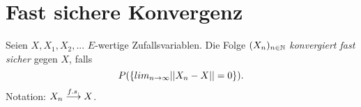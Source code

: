 \section{Fast sichere Konvergenz}
\begin{mydef}
    Seien $X, X_1, X_2,...$ $E$-wertige Zufallsvariablen. Die Folge $(X_n)_{n \in \mathbb{N}}$ \textit{konvergiert fast sicher} gegen $X$, falls
    $$
        P(\{ lim_{n \to \infty} \lvert \lvert X_n - X \rvert \rvert = 0 \}).
    $$
Notation: $X_n \overset{f.s.}{\longrightarrow} X$. 
\end{mydef}